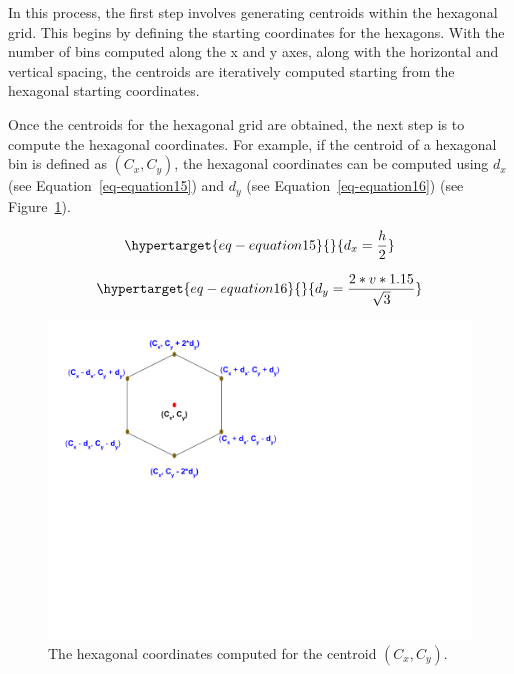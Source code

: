 \documentclass[
  12pt]{article}
\begin{document}
In this process, the first step involves generating centroids within the
hexagonal grid. This begins by defining the starting coordinates for the
hexagons. With the number of bins computed along the x and y axes, along
with the horizontal and vertical spacing, the centroids are iteratively
computed starting from the hexagonal starting coordinates.

Once the centroids for the hexagonal grid are obtained, the next step is
to compute the hexagonal coordinates. For example, if the centroid of a
hexagonal bin is defined as \((C_x, C_y)\), the hexagonal coordinates
can be computed using \(d_x\) (see Equation~\ref{eq-equation15}) and
\(d_y\) (see Equation~\ref{eq-equation16}) (see
Figure~\ref{fig-hexcoord}).

\begin{equation}\protect\hypertarget{eq-equation15}{}{
d_x = \frac{h}{2}
}\label{eq-equation15}\end{equation}

\begin{equation}\protect\hypertarget{eq-equation16}{}{
d_y = \frac{2* v * 1.15}{\sqrt{3}} 
}\label{eq-equation16}\end{equation}

\begin{figure}[H]

{\centering \includegraphics[width=1\textwidth,height=1\textheight]{figures/hex_coord.png}

}

\caption{\label{fig-hexcoord}The hexagonal coordinates computed for the
centroid \((C_x, C_y)\).}

\end{figure}
\end{document}
